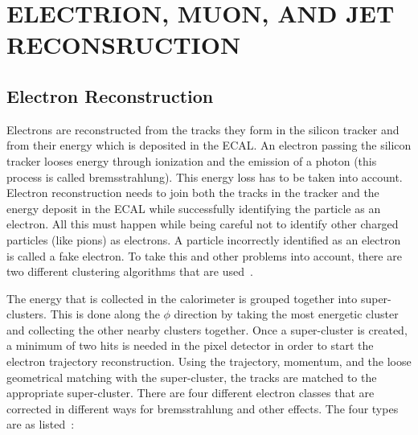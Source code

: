 

\chapter{ELECTRION, MUON, AND JET RECONSRUCTION}

\section{Electron Reconstruction}

Electrons are reconstructed from the tracks they form in the silicon tracker and from their energy which is deposited in the ECAL. An electron passing the silicon tracker looses energy through ionization and the emission of a photon (this process is called bremsstrahlung). This energy loss has to be taken into account.  Electron reconstruction needs to join both the tracks in the tracker and the energy deposit in the ECAL while successfully identifying the particle as an electron.  All this must happen while being careful not to identify other charged particles (like pions) as electrons. A particle incorrectly identified as an electron is called a fake electron. To take this and other problems into account, there are two different clustering algorithms that are used~\cite{Meschi:687345}. 

The energy that is collected in the calorimeter is grouped together into super-clusters. This is done along the $\phi$ direction by taking the most energetic cluster and collecting the other nearby clusters together. Once a super-cluster is created, a minimum of two hits is needed in the pixel detector in order to start the electron trajectory reconstruction. Using the trajectory, momentum, and the loose geometrical matching with the super-cluster, the tracks are matched to the appropriate super-cluster. There are four different electron classes that are corrected in different ways for bremsstrahlung and other effects.  The four types are as listed~\cite{Baffioni:934070}:

